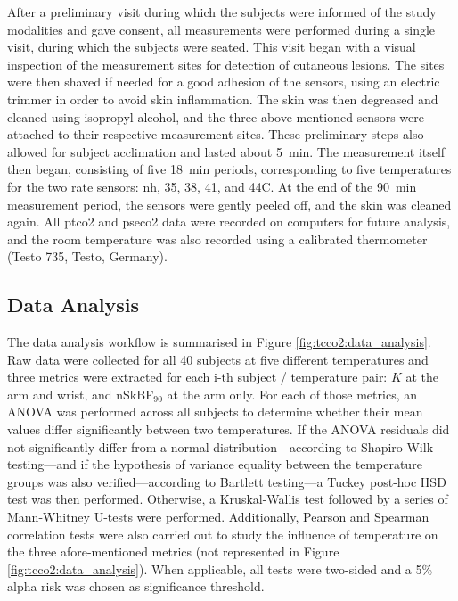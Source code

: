 After a preliminary visit during which the subjects were informed of the study modalities and gave consent, all measurements were performed during a single visit, during which the subjects were seated. This visit began with a visual inspection of the measurement sites for detection of cutaneous lesions. The sites were then shaved if needed for a good adhesion of the sensors, using an electric trimmer in order to avoid skin inflammation. The skin was then degreased and cleaned using isopropyl alcohol, and the three above-mentioned sensors were attached to their respective measurement sites. These preliminary steps also allowed for subject acclimation and lasted about 5~min. The measurement itself then began, consisting of five 18~min periods, corresponding to five temperatures for the two rate sensors: \gls{nh}, 35, 38, 41, and 44{\degree}C. At the end of the 90~min measurement period, the sensors were gently peeled off, and the skin was cleaned again. All \gls{ptco2} and \gls{pseco2} data were recorded on computers for future analysis, and the room temperature was also recorded using a calibrated thermometer (Testo 735, Testo, Germany).

\subsection{Data Analysis}\label{subsect:tcco2:data_anal}

The data analysis workflow is summarised in Figure \ref{fig:tcco2:data_analysis}. Raw data were collected for all 40 subjects at five different temperatures and three metrics were extracted for each i-th subject / temperature pair: $K$ at the arm and wrist, and nSkBF$_{90}$ at the arm only. For each of those metrics, an ANOVA was performed across all subjects to determine whether their mean values differ significantly between two temperatures. If the ANOVA residuals did not significantly differ from a normal distribution---according to Shapiro-Wilk testing---and if the hypothesis of variance equality between the temperature groups was also verified---according to Bartlett testing---a Tuckey post-hoc HSD test was then performed. Otherwise, a Kruskal-Wallis test followed by a series of Mann-Whitney U-tests were performed. Additionally, Pearson and Spearman correlation tests were also carried out to study the influence of temperature on the three afore-mentioned metrics (not represented in Figure \ref{fig:tcco2:data_analysis}). When applicable, all tests were two-sided and a 5\% alpha risk was chosen as significance threshold.

